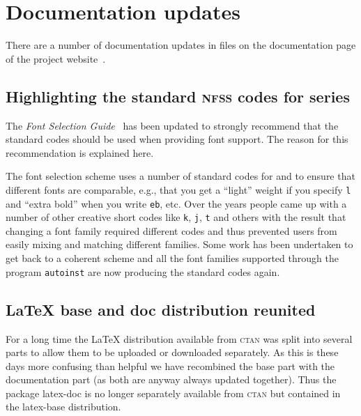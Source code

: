 \documentclass{ltnews}
\providecommand\acro[1]{\textsc{#1}}
\providecommand\CTAN{\textsc{ctan}}
\begin{document}
\section{Documentation updates}

There are a number of
documentation updates in files
on the documentation page of the project website~\cite{30:site-doc}.

\subsection{Highlighting the standard \texorpdfstring{\acro{nfss}}{NFSS} codes for series}

The \emph{Font Selection Guide}~\cite{fntguide} has been
updated to strongly recommend that the standard codes should be used
when providing font support.  The reason for this recommendation is explained here.


The font selection scheme uses a number of standard codes for
 and  to ensure that different fonts are
comparable, e.g., that you get a \enquote{light} weight if you specify
\texttt{l} and \enquote{extra bold} when you write \texttt{eb},
etc. Over the years people came up with a number of other creative
short codes like \texttt{k}, \texttt{j}, \texttt{t} and others with
the result that changing a font family required different codes and
thus prevented users from easily mixing and matching different
families.
Some work has been undertaken to get back to a coherent scheme and
all the font families supported through the program \texttt{autoinst}
are now producing the standard codes again.


\subsection{\LaTeX{} \textsf{base} and \textsf{doc} distribution reunited}

For a long time the \LaTeX{} distribution available from \CTAN{} was
split into several parts to allow them to be uploaded or downloaded
separately. As this is these days more confusing than helpful we have
recombined the base part with the documentation part (as both are
anyway always updated together). Thus the package \textsf{latex-doc}
is no longer separately available from \CTAN{} but contained in the
\textsf{latex-base} distribution.
\end{document}
